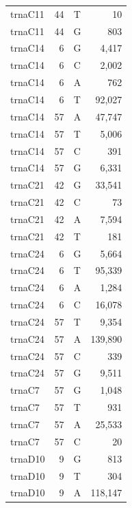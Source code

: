 \documentclass[12pt]{rockefeller}
\begin{document}
{\begin{center}
\begin{supertabular}{|l|r|c|r|}
 trnaC11 &        44 &          T &         10 \\
 trnaC11 &        44 &          G &        803 \\
 trnaC14 &         6 &          G &      4,417 \\
 trnaC14 &         6 &          C &      2,002 \\
 trnaC14 &         6 &          A &        762 \\
 trnaC14 &         6 &          T &     92,027 \\
 trnaC14 &        57 &          A &     47,747 \\
 trnaC14 &        57 &          T &      5,006 \\
 trnaC14 &        57 &          C &        391 \\
 trnaC14 &        57 &          G &      6,331 \\
 trnaC21 &        42 &          G &     33,541 \\
 trnaC21 &        42 &          C &         73 \\
 trnaC21 &        42 &          A &      7,594 \\
 trnaC21 &        42 &          T &        181 \\
 trnaC24 &         6 &          G &      5,664 \\
 trnaC24 &         6 &          T &     95,339 \\
 trnaC24 &         6 &          A &      1,284 \\
 trnaC24 &         6 &          C &     16,078 \\
 trnaC24 &        57 &          T &      9,354 \\
 trnaC24 &        57 &          A &    139,890 \\
 trnaC24 &        57 &          C &        339 \\
 trnaC24 &        57 &          G &      9,511 \\
  trnaC7 &        57 &          G &      1,048 \\
  trnaC7 &        57 &          T &        931 \\
  trnaC7 &        57 &          A &     25,533 \\
  trnaC7 &        57 &          C &         20 \\
 trnaD10 &         9 &          G &        813 \\
 trnaD10 &         9 &          T &        304 \\
 trnaD10 &         9 &          A &    118,147 \\

\end{supertabular}
\end{center}}
\end{document}
